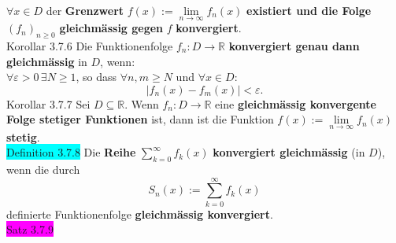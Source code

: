 \documentclass[landscape, 10pt]{article}
\newcommand{\R}{\mathbb{R}}
\begin{document}
\begin{multicols}{3}
                     \textcolor{NavyBlue}{$\forall x\in D$} der 
                     \textbf{Grenzwert} 
                     \textcolor{NavyBlue}{
                     $f(x):=\lim\limits_{n\to\infty}f_n(x)$}
                     \textbf{existiert und die Folge}
                     \textcolor{NavyBlue}{$(f_n)_{n\geqslant0}$} 
                     \textbf{gleichmässig gegen} 
                     \textcolor{NavyBlue}{$f$} 
                     \textbf{konvergiert}.\\
              \colorbox{BurntOrange}{Korollar 3.7.6} 
                     Die Funktionenfolge 
                     \textcolor{NavyBlue}{
                     $f_n:D\longrightarrow\R$}
                     \textbf{konvergiert genau 
                     dann gleichmässig} in $D$, wenn: \\
                     \textcolor{NavyBlue}{
                     $\forall\varepsilon>0\,\exists N\geqslant1$}, 
                     so dass 
                     \textcolor{NavyBlue}{$\forall n,m\geqslant N$} und 
                     \textcolor{NavyBlue}{
                     $\forall x\in D:$}
                     \begin{equation*}
                           |f_n(x)-f_m(x)|<\varepsilon. 
                     \end{equation*}
              \colorbox{BurntOrange}{Korollar 3.7.7} 
                     Sei \textcolor{NavyBlue}{$D\subseteq\R$}. 
                     Wenn 
                     \textcolor{NavyBlue}{$f_n:D\longrightarrow\R$} 
                     eine \textbf{gleichmässig konvergente Folge 
                     stetiger Funktionen} ist, 
                     dann ist die Funktion 
                     \textcolor{NavyBlue}{
                     $f(x):=\lim\limits_{n\to\infty}f_n(x)$} 
                     \textbf{stetig}.\\
              \colorbox{cyan}{Definition 3.7.8} 
                     Die \textbf{Reihe}
                     \textcolor{NavyBlue}{
                     $\sum_{k=0}^\infty f_k(x)$}
                     \textbf{konvergiert gleichmässig} 
                     (in $D$), wenn die durch 
                     \begin{equation*}
                            S_n(x):=\sum_{k=0}^\infty f_k(x)
                     \end{equation*}
                     definierte Funktionenfolge 
                     \textbf{gleichmässig konvergiert}.\\
              \colorbox{magenta}{Satz 3.7.9} 

\end{multicols}
\end{document}
